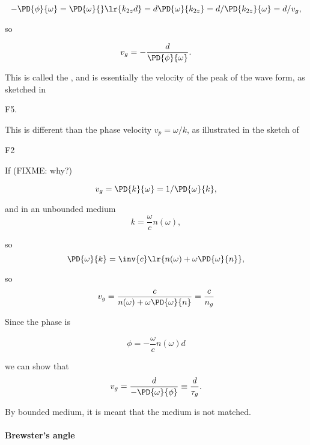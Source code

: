 \begin{dmath}\label{eqn:emtLecture10:520}
- \PD{\phi}{\omega} 
= \PD{\omega}{} \lr{ k_{2z} d }
= d \PD{\omega}{k_{2z}}
= d /\PD{k_{2z}}{\omega}
= d / v_g,
\end{dmath}

so 

\begin{dmath}\label{eqn:emtLecture10:540}
v_g = -\frac{d}{\PD{\phi}{\omega}}.
\end{dmath}

This is called the , and is essentially the velocity of the peak of the wave form, as sketched in

F5.

This is different than the phase velocity \( v_p = \omega/k \), as illustrated in the sketch of 

F2

If (FIXME: why?) 

\begin{dmath}\label{eqn:emtLecture10:660}
v_g
= \PD{k}{\omega}
= 1/\PD{\omega}{k},
\end{dmath}

and in an unbounded medium
\begin{dmath}\label{eqn:emtLecture10:560}
   k = \frac{\omega}{c} n(\omega),
\end{dmath}

so
\begin{dmath}\label{eqn:emtLecture10:580}
\PD{\omega}{k} 
= 
\inv{c} \lr{ n(\omega) + \omega \PD{\omega}{n} },
\end{dmath}

so
\begin{equation}\label{eqn:emtLecture10:600}
v_g 
= \frac{c}{n(\omega) + \omega \PD{\omega}{n} }
= \frac{c}{n_g}
\end{equation}

Since the phase is

\begin{dmath}\label{eqn:emtLecture10:680}
\phi = -\frac{\omega}{c} n(\omega) d
\end{dmath}

we can show that
\begin{dmath}\label{eqn:emtLecture10:700}
v_g 
= \frac{d}{-\PD{\omega}{\phi}}
\equiv
\frac{d}{\tau_g}.
\end{dmath}

By bounded medium, it is meant that the medium is not matched.

\paragraph{Brewster's angle}

